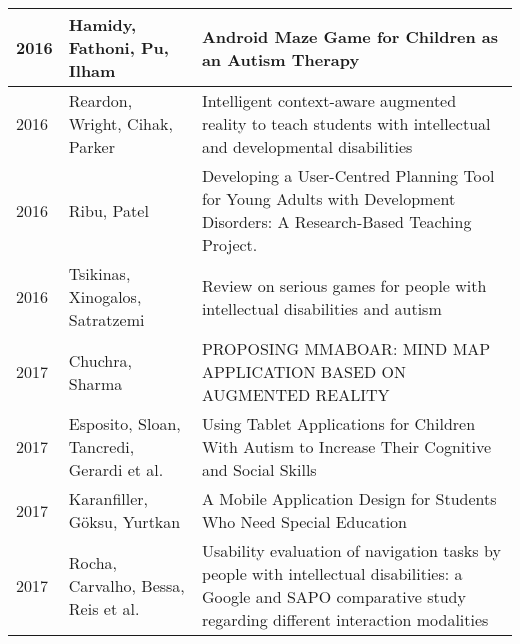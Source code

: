 \documentclass[utf8,english]{gradu3}
\begin{document}
\begin{longtable}{|>{\scriptsize}l|>{\scriptsize}p{3cm}|>{\scriptsize}p{10.4cm}|}
  2016          & Hamidy, Fathoni, Pu, Ilham                                   & Android Maze Game for Children as an Autism Therapy                                                                                                                                                                            \\ \hline
  2016          & Reardon, Wright, Cihak, Parker                               & Intelligent context-aware augmented reality to teach students with intellectual and developmental disabilities                                                                                                                 \\ \hline
  2016          & Ribu, Patel                                                  & Developing a User-Centred Planning Tool for Young Adults with Development Disorders: A Research-Based Teaching Project.                                                                                                        \\ \hline
  2016          & Tsikinas, Xinogalos, Satratzemi                              & Review on serious games for people with intellectual disabilities and autism                                                                                                                                                   \\ \hline
  2017          & Chuchra, Sharma                                              & PROPOSING MMABOAR: MIND MAP APPLICATION BASED ON AUGMENTED REALITY                                                                                                                                                             \\ \hline
  2017          & Esposito, Sloan, Tancredi, Gerardi et al.                    & Using Tablet Applications for Children With Autism to Increase Their Cognitive and Social Skills                                                                                                                               \\ \hline
  2017          & Karanfiller, Göksu, Yurtkan                                  & A Mobile Application Design for Students Who Need Special Education                                                                                                                                                            \\ \hline
  2017          & Rocha, Carvalho, Bessa, Reis et al.                          & Usability evaluation of navigation tasks by people with intellectual disabilities: a Google and SAPO comparative study regarding different interaction modalities                                                              \\ \hline

\end{longtable}
\end{document}
